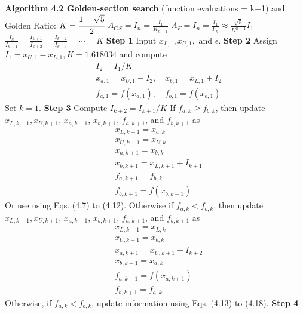 \begin{multicols}{3}
\textbf{Algorithm 4.2 Golden-section search} \newline
(function evaluations = k+1) and Golden Ratio: $K=\cfrac{1+\sqrt{5}}{2}$
$\Lambda_{GS} = I_n = \frac{I_1}
{K_{n-1}}$ \quad $\Lambda_{F} = I_n = \frac{I_1}
{F_n} \approx \frac{\sqrt{5}}
{K^{n+1}}I_1$
$\frac{I_k}{I_{k+1}}=\frac{I_{k+1}}{I_{k+2}}
= \frac{I_{k+2}}{I_{k+3}}
= \cdots = K$ \newline
\textbf{Step 1} \newline
Input $x_{L,1}, x_{U,1},$ and $\epsilon$. \newline
\textbf{Step 2} \newline
Assign $I_1 = x_{U,1} - x_{L,1}, K = 1.618034$ and compute
\begin{align*}
&I_2 = I_1/K \\
&x_{a,1} = x_{U,1} - I_2, \quad x_{b,1} = x_{L,1} + I_2 \\
&f_{a,1} = f(x_{a,1}), \quad f_{b,1} = f(x_{b,1}) 
\end{align*}
Set $k = 1$. \newline
\textbf{Step 3} \newline
Compute $I_{k+2} = I_{k+1}/K$ \newline
If $f_{a,k} \geq f_{b,k}$, then update $x_{L,k+1}, x_{U,k+1}$, $x_{a,k+1}$, $x_{b,k+1}$, $f_{a,k+1}$,
and $f_{b,k+1}$ as  
\begin{align*}
& x_{L,k+1}=x_{a,k} \\
& x_{U,k+1}=x_{U,k} \\
& x_{a,k+1}=x_{b,k} \\
& x_{b,k+1}=x_{L,k+1}+I_{k+1} \\
& f_{a,k+1}=f_{b,k} \\
& f_{b,k+1}=f(x_{b,k+1})
\end{align*}
Or use using Eqs. (4.7) to (4.12). 
Otherwise if $f_{a,k} < f_{b,k}$, then update $x_{L,k+1}, x_{U,k+1}$, $x_{a,k+1}$, $x_{b,k+1}$, $f_{a,k+1}$, and $f_{b,k+1}$ as
\begin{align*}
& x_{L,k+1}=x_{L,k} \\
& x_{U,k+1}=x_{b,k} \\
& x_{a,k+1}=x_{U,k+1}-I_{k+2} \\
& x_{b,k+1}=x_{a,k} \\
& f_{a,k+1}=f(x_{a,k+1}) \\
& f_{b,k+1}=f_{a,k}
\end{align*}
Otherwise, if $f_{a,k} < f_{b,k}$, update
information using Eqs. (4.13) to (4.18). \newline
\textbf{Step 4} \newline

\end{multicols}
